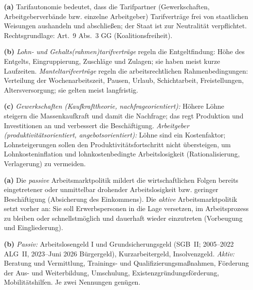 \documentclass[11pt, a4paper]{article}
\begin{document}
\begin{loesung}[title={Lösung Aufgabe~5 --- Tarifpolitik}]
\textbf{(a)} Tarifautonomie bedeutet, dass die Tarifpartner (Gewerkschaften,
Arbeitgeberverbände bzw. einzelne Arbeitgeber) Tarifverträge frei von staatlichen
Weisungen aushandeln und abschließen; der Staat ist zur Neutralität verpflichtet.
Rechtsgrundlage: Art.~9 Abs.~3 GG (Koalitionsfreiheit).

\textbf{(b)} \emph{Lohn- und Gehalts(rahmen)tarifverträge} regeln die Entgeltfindung:
Höhe des Entgelts, Eingruppierung, Zuschläge und Zulagen; sie haben meist kurze
Laufzeiten. \emph{Manteltarifverträge} regeln die arbeitsrechtlichen Rahmenbedingungen:
Verteilung der Wochenarbeitszeit, Pausen, Urlaub, Schichtarbeit, Freistellungen,
Altersversorgung; sie gelten meist langfristig.

\textbf{(c)} \emph{Gewerkschaften (Kaufkrafttheorie, nachfrageorientiert):} Höhere Löhne
steigern die Massenkaufkraft und damit die Nachfrage; das regt Produktion und
Investitionen an und verbessert die Beschäftigung. \emph{Arbeitgeber
(produktivitätsorientiert, angebotsorientiert):} Löhne sind ein Kostenfaktor;
Lohnsteigerungen sollen den Produktivitätsfortschritt nicht übersteigen, um
Lohnkosteninflation und lohnkostenbedingte Arbeitslosigkeit (Rationalisierung,
Verlagerung) zu vermeiden.
\end{loesung}

\begin{loesung}[title={Lösung Aufgabe~6 --- Arbeitsmarktpolitik}]
\textbf{(a)} Die \emph{passive} Arbeitsmarktpolitik mildert die wirtschaftlichen Folgen
bereits eingetretener oder unmittelbar drohender Arbeitslosigkeit bzw. geringer
Beschäftigung (Absicherung des Einkommens). Die \emph{aktive} Arbeitsmarktpolitik setzt
vorher an: Sie soll Erwerbspersonen in die Lage versetzen, im Arbeitsprozess zu bleiben
oder schnellstmöglich und dauerhaft wieder einzutreten (Vorbeugung und Eingliederung).

\textbf{(b)} \emph{Passiv:} Arbeitslosengeld I und Grundsicherungsgeld (SGB~II; 2005--2022 ALG~II, 2023--Juni 2026 Bürgergeld),
Kurzarbeitergeld,
Insolvenzgeld. \emph{Aktiv:} Beratung und Vermittlung, Trainings- und
Qualifizierungsmaßnahmen, Förderung der Aus- und Weiterbildung, Umschulung,
Existenzgründungsförderung, Mobilitätshilfen. Je zwei Nennungen genügen.
\end{loesung}
\end{document}
